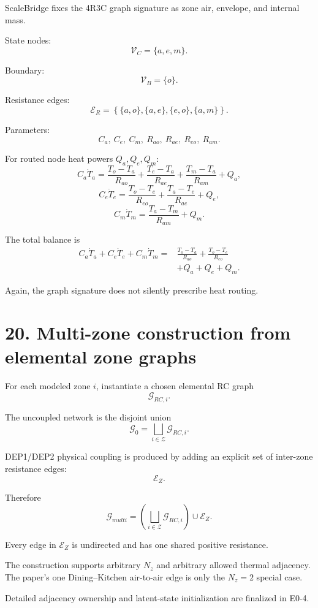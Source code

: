 \documentclass[11pt]{article}
\newcommand{\Vc}{\mathcal{V}_{C}}
\newcommand{\Vb}{\mathcal{V}_{B}}
\newcommand{\Er}{\mathcal{E}_{R}}
\newcommand{\Zset}{\mathcal{Z}}
\begin{document}
ScaleBridge fixes the 4R3C graph signature as zone air, envelope, and internal
mass.

State nodes:
\[
\Vc=\{a,e,m\}.
\]

Boundary:
\[
\Vb=\{o\}.
\]

Resistance edges:
\[
\boxed{
\Er=
\left\{
\{a,o\},
\{a,e\},
\{e,o\},
\{a,m\}
\right\}.
}
\]

Parameters:
\[
C_a,\ C_e,\ C_m,\ R_{ao},\ R_{ae},\ R_{eo},\ R_{am}.
\]

For routed node heat powers $Q_a,Q_e,Q_m$:
\[
\boxed{
C_a\dot T_a
=
\frac{T_o-T_a}{R_{ao}}
+
\frac{T_e-T_a}{R_{ae}}
+
\frac{T_m-T_a}{R_{am}}
+
Q_a,
}
\tag{E0.3-30}
\]
\[
\boxed{
C_e\dot T_e
=
\frac{T_o-T_e}{R_{eo}}
+
\frac{T_a-T_e}{R_{ae}}
+
Q_e,
}
\tag{E0.3-31}
\]
\[
\boxed{
C_m\dot T_m
=
\frac{T_a-T_m}{R_{am}}
+
Q_m.
}
\tag{E0.3-32}
\]

The total balance is
\[
\boxed{
\begin{aligned}
C_a\dot T_a+C_e\dot T_e+C_m\dot T_m
={}&
\frac{T_o-T_a}{R_{ao}}
+
\frac{T_o-T_e}{R_{eo}}\\
&+
Q_a+Q_e+Q_m.
\end{aligned}
}
\tag{E0.3-33}
\]

Again, the graph signature does not silently prescribe heat routing.

\section*{20. Multi-zone construction from elemental zone graphs}

For each modeled zone $i$, instantiate a chosen elemental RC graph
\[
\mathcal{G}_{RC,i}.
\]

The uncoupled network is the disjoint union
\[
\mathcal{G}_{0}
=
\bigsqcup_{i\in\Zset}
\mathcal{G}_{RC,i}.
\]

DEP1/DEP2 physical coupling is produced by adding an explicit set of
inter-zone resistance edges:
\[
\mathcal{E}_{Z}.
\]

Therefore
\[
\boxed{
\mathcal{G}_{multi}
=
\left(
\bigsqcup_{i\in\Zset}
\mathcal{G}_{RC,i}
\right)
\cup
\mathcal{E}_{Z}.
}
\tag{E0.3-34}
\]

Every edge in $\mathcal{E}_{Z}$ is undirected and has one shared positive
resistance.

The construction supports arbitrary $N_z$ and arbitrary allowed thermal
adjacency.  The paper's one Dining--Kitchen air-to-air edge is only the
$N_z=2$ special case.

Detailed adjacency ownership and latent-state initialization are finalized in
E0-4.
\end{document}
